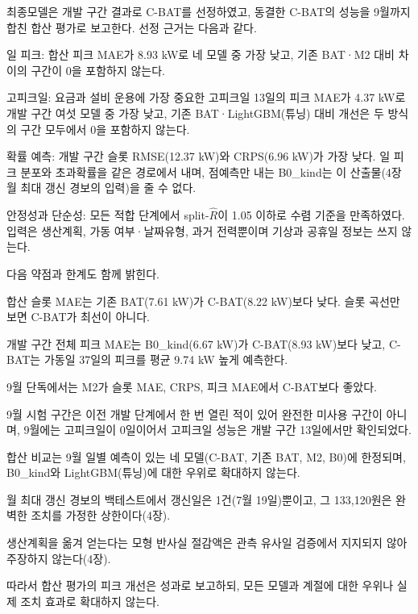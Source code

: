 최종모델은 개발 구간 결과로 C-BAT를 선정하였고, 동결한 C-BAT의 성능을 9월까지 합친 합산 평가로 보고한다. 선정 근거는 다음과 같다.
\begin{hwplist}
\item 일 피크: 합산 피크 MAE가 8.93 kW로 네 모델 중 가장 낮고, 기존 BAT·M2 대비 차이의 구간이 0을 포함하지 않는다.
\item 고피크일: 요금과 설비 운용에 가장 중요한 고피크일 13일의 피크 MAE가 4.37 kW로 개발 구간 여섯 모델 중 가장 낮고, 기존 BAT·LightGBM(튜닝) 대비 개선은 두 방식의 구간 모두에서 0을 포함하지 않는다.
\item 확률 예측: 개발 구간 슬롯 RMSE(12.37 kW)와 CRPS(6.96 kW)가 가장 낮다. 일 피크 분포와 초과확률을 같은 경로에서 내며, 점예측만 내는 B0\_kind는 이 산출물(4장 월 최대 갱신 경보의 입력)을 줄 수 없다.
\item 안정성과 단순성: 모든 적합 단계에서 split-$\hat R$이 1.05 이하로 수렴 기준을 만족하였다. 입력은 생산계획, 가동 여부·날짜유형, 과거 전력뿐이며 기상과 공휴일 정보는 쓰지 않는다.
\end{hwplist}
다음 약점과 한계도 함께 밝힌다.
\begin{hwplist}
\item 합산 슬롯 MAE는 기존 BAT(7.61 kW)가 C-BAT(8.22 kW)보다 낮다. 슬롯 곡선만 보면 C-BAT가 최선이 아니다.
\item 개발 구간 전체 피크 MAE는 B0\_kind(6.67 kW)가 C-BAT(8.93 kW)보다 낮고, C-BAT는 가동일 37일의 피크를 평균 9.74 kW 높게 예측한다.
\item 9월 단독에서는 M2가 슬롯 MAE, CRPS, 피크 MAE에서 C-BAT보다 좋았다.
\item 9월 시험 구간은 이전 개발 단계에서 한 번 열린 적이 있어 완전한 미사용 구간이 아니며, 9월에는 고피크일이 0일이어서 고피크일 성능은 개발 구간 13일에서만 확인되었다.
\item 합산 비교는 9월 일별 예측이 있는 네 모델(C-BAT, 기존 BAT, M2, B0)에 한정되며, B0\_kind와 LightGBM(튜닝)에 대한 우위로 확대하지 않는다.
\item 월 최대 갱신 경보의 백테스트에서 갱신일은 1건(7월 19일)뿐이고, 그 133,120원은 완벽한 조치를 가정한 상한이다(4장).
\item 생산계획을 옮겨 얻는다는 모형 반사실 절감액은 관측 유사일 검증에서 지지되지 않아 주장하지 않는다(4장).
\end{hwplist}
따라서 합산 평가의 피크 개선은 성과로 보고하되, 모든 모델과 계절에 대한 우위나 실제 조치 효과로 확대하지 않는다.
